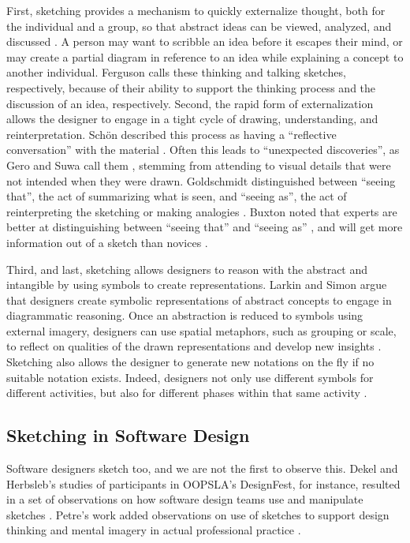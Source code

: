 First, sketching provides a mechanism to quickly externalize thought, both for the individual and a group, so that abstract ideas can be viewed, analyzed, and discussed \citep{Petrea}. A person may want to scribble an idea before it escapes their mind, or may create a partial diagram in reference to an idea while explaining a concept to another individual. Ferguson \citep{eugene1992engineering} calls these thinking and talking sketches, respectively, because of their ability to support the thinking process and the discussion of an idea, respectively. 
Second, the rapid form of externalization allows the designer to engage in a tight cycle of drawing, understanding, and reinterpretation. Sch\"{o}n described this process as having a ``reflective conversation'' with the material \citep{schon}. Often this leads to ``unexpected discoveries'', as Gero and Suwa call them \citep{Suwa}, stemming from attending to visual details that were not intended when they were drawn. Goldschmidt distinguished between ``seeing that'', the act of summarizing what is seen, and ``seeing as'', the act of reinterpreting the sketching or making analogies \citep{Goldschmidt}. Buxton noted that experts are better at distinguishing between ``seeing that'' and ``seeing as'' \citep{buxton2010sketching}, and will get more information out of a sketch than novices \citep{Goldschmidt}. 

Third, and last, sketching allows designers to reason with the abstract and intangible by using symbols to create representations. Larkin and Simon argue that designers create symbolic representations of abstract concepts to engage in diagrammatic reasoning. Once an abstraction is reduced to symbols using external imagery, designers can use spatial metaphors, such as grouping or scale, to reflect on qualities of the drawn representations and develop new insights \citep{Larkin}. Sketching also allows the designer to generate new notations on the fly if no suitable notation exists. Indeed, designers not only use different symbols for different activities, but also for different phases within that same activity \citep{Goel}. 

\subsection{Sketching in Software Design}
\label{sketching:2}
Software designers sketch too, and we are not the first to observe this. Dekel and Herbsleb's studies of participants in OOPSLA's DesignFest, for instance, resulted in a set of observations on how software design teams use and manipulate sketches \citep{dekel2007notation}. Petre's work added observations on use of sketches to support design thinking and mental imagery in actual professional practice \citep{petre2009insights}.


